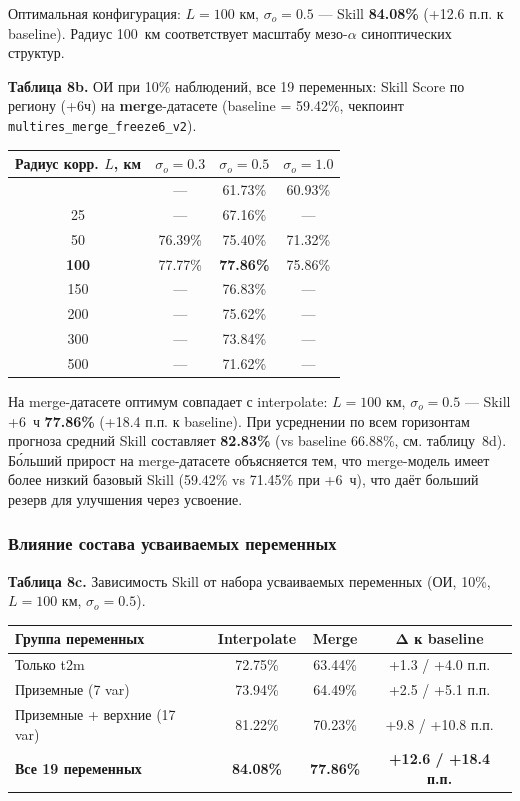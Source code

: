 \documentclass[14pt,a4paper]{extarticle}
\newcounter{none}
\numberwithin{table}{section}
\numberwithin{figure}{section}
\numberwithin{equation}{section}
\begin{document}
Оптимальная конфигурация: \(L = 100\) км, \(\sigma_o = 0.5\) --- Skill
\textbf{84.08\%} (+12.6 п.п. к baseline). Радиус 100~км соответствует
масштабу мезо-\(\alpha\) синоптических структур.

\textbf{Таблица 8b.} ОИ при 10\% наблюдений, все 19 переменных: Skill
Score по региону (+6ч) на \textbf{merge}-датасете (baseline = 59.42\%,
чекпоинт \texttt{multires\_merge\_freeze6\_v2}).

{\def\LTcaptype{none}
\begin{longtable}[]{@{}cccc@{}}
\toprule\noalign{}
Радиус корр. $L$, км & $\sigma_o = 0.3$ & $\sigma_o = 0.5$ & $\sigma_o = 1.0$ \\
\midrule\noalign{}
\endhead
\bottomrule\noalign{}
\endlastfoot
10 & --- & 61.73\% & 60.93\% \\
25 & --- & 67.16\% & --- \\
50 & 76.39\% & 75.40\% & 71.32\% \\
\textbf{100} & 77.77\% & \textbf{77.86\%} & 75.86\% \\
150 & --- & 76.83\% & --- \\
200 & --- & 75.62\% & --- \\
300 & --- & 73.84\% & --- \\
500 & --- & 71.62\% & --- \\
\end{longtable}
}

На merge-датасете оптимум совпадает с interpolate: \(L = 100\) км,
\(\sigma_o = 0.5\) --- Skill +6~ч \textbf{77.86\%} (+18.4 п.п. к
baseline). При усреднении по всем горизонтам прогноза средний
Skill составляет \textbf{82.83\%} (vs baseline 66.88\%, см.
таблицу~8d). Бо́льший прирост на merge-датасете объясняется тем, что
merge-модель имеет более низкий базовый Skill (59.42\% vs 71.45\% при
+6~ч), что даёт больший резерв для улучшения через усвоение.

\subsubsection{Влияние состава усваиваемых переменных}

\textbf{Таблица 8c.} Зависимость Skill от набора усваиваемых переменных
(ОИ, 10\%, \(L = 100\) км, \(\sigma_o = 0.5\)).

{\def\LTcaptype{none}
\begin{longtable}[]{@{}lccc@{}}
\toprule\noalign{}
Группа переменных & Interpolate & Merge & Δ к baseline \\
\midrule\noalign{}
\endhead
\bottomrule\noalign{}
\endlastfoot
Только t2m & 72.75\% & 63.44\% & +1.3 / +4.0 п.п. \\
Приземные (7 var) & 73.94\% & 64.49\% & +2.5 / +5.1 п.п. \\
Приземные + верхние (17 var) & 81.22\% & 70.23\% & +9.8 / +10.8 п.п. \\
\textbf{Все 19 переменных} & \textbf{84.08\%} & \textbf{77.86\%} & \textbf{+12.6 / +18.4 п.п.} \\
\end{longtable}
}
\end{document}
